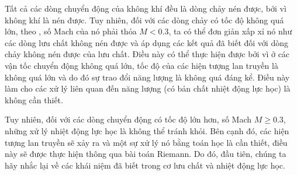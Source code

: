 \documentclass[../../../main.tex]{subfiles}
\begin{document}
    Tất cả các dòng chuyển động của không khí đều là dòng chảy nén được, bởi vì không khí là nén được. Tuy nhiên, đối với các dòng chảy có tốc độ không quá lớn, theo , số Mach của nó phải thỏa $M <0.3$, ta có thể đơn giản xấp xỉ nó như các dòng lưu chất không nén được và áp dụng các kết quả đã biết đối với dòng chảy không nén được của lưu chất. Điều này có thể thực hiện được bởi vì ở các vận tốc chuyển động không quá lớn, tốc độ của các hiện tượng lan truyền là không quá lớn và do đó sự trao đổi năng lượng là không quá đáng kể. Điều này làm cho các xử lý liên quan đến năng lượng (có bản chất nhiệt động lực học) là không cần thiết.

    Tuy nhiên, đối với các dòng chuyển động có tốc độ lớn hơn, số Mach $M\ge 0.3$, những xử lý nhiệt động lực học là không thể tránh khỏi. Bên cạnh đó, các hiện tượng lan truyền sẽ xảy ra và một sự xử lý nó bằng toán học là cần thiết, điều này sẽ được thực hiện thông qua bài toán Riemann. Do đó, đầu tiên, chúng ta hãy nhắc lại về các khái niệm đã biết trong cơ lưu chất và nhiệt động lực học.
\end{document}
